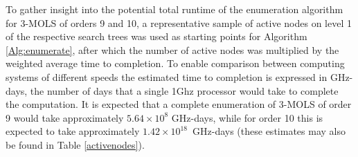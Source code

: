 To gather insight into the potential total runtime of the enumeration algorithm for $3$-MOLS of orders 9 and 10, a representative sample of active nodes on level 1 of the respective search trees   was used as starting points for Algorithm \ref{Alg:enumerate}, after which %
the   number of active nodes was multiplied by the weighted average time to completion. To enable comparison between computing systems of different speeds the estimated time to completion is expressed in GHz-days, the number of days that a single 1Ghz processor would take to complete the computation. It is expected that a complete enumeration of $3$-MOLS of order 9 would take approximately $5.64\times 10^{8}$ GHz-days, while for order 10 this is expected to  take approximately $1.42\times 10^{18}$~GHz-days (these estimates may also be found in Table \ref{activenodes}).

